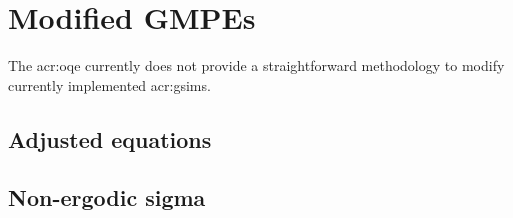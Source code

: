 \section{Modified GMPEs}
The \gls{acr:oqe} currently does not provide a straightforward methodology 
to modify currently implemented \glspl{acr:gsim}.
%
\subsection{Adjusted equations}
%
\subsection{Non-ergodic sigma}

